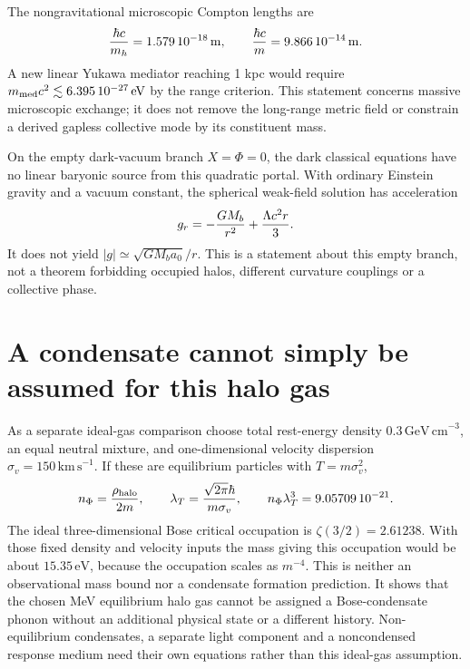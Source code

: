 \documentclass[11pt]{article}
\begin{document}
The nongravitational microscopic Compton lengths are
\begin{equation}
 {\hbar c\over m_h}=1.579\,10^{-18}\,\mathrm m,\qquad
 {\hbar c\over m}=9.866\,10^{-14}\,\mathrm m.
\end{equation}
A new linear Yukawa mediator reaching 1 kpc would require
$m_{\rm med}c^2\lesssim6.395\,10^{-27}\,\mathrm{eV}$ by the
range criterion. This statement concerns massive microscopic exchange;
it does not remove the long-range metric field or constrain a derived
gapless collective mode by its constituent mass.

On the empty dark-vacuum branch $X=\Phi=0$, the dark classical equations
have no linear baryonic source from this quadratic portal. With ordinary
Einstein gravity and a vacuum constant, the spherical weak-field solution
has acceleration
\begin{equation}
 g_r=-{GM_b\over r^2}+{\Lambda c^2 r\over3}.
\end{equation}
It does not yield $|g|\simeq\sqrt{GM_ba_0}/r$. This is a statement
about this empty branch, not a theorem forbidding occupied halos,
different curvature couplings or a collective phase.

\section{A condensate cannot simply be assumed for this halo gas}
As a separate ideal-gas comparison choose total rest-energy density
$0.3\,\mathrm{GeV\,cm}^{-3}$, an equal neutral mixture, and
one-dimensional velocity dispersion $\sigma_v=150\,\mathrm{km\,s}^{-1}$.
If these are equilibrium particles with $T=m\sigma_v^2$,
\begin{equation}
 n_\Phi={\rho_{\rm halo}\over2m},\qquad
 \lambda_T={\sqrt{2\pi}\hbar\over m\sigma_v},\qquad
 n_\Phi\lambda_T^3=9.05709\,10^{-21}.
\end{equation}
The ideal three-dimensional Bose critical occupation is
$\zeta(3/2)=2.61238$. With those fixed density and velocity inputs the
mass giving this occupation would be about $15.35\,\mathrm{eV}$,
because the occupation scales as $m^{-4}$. This is neither an observational
mass bound nor a condensate formation prediction. It shows that the chosen
MeV equilibrium halo gas cannot be assigned a Bose-condensate phonon
without an additional physical state or a different history. Non-equilibrium
condensates, a separate light component and a noncondensed response medium
need their own equations rather than this ideal-gas assumption.
\end{document}
